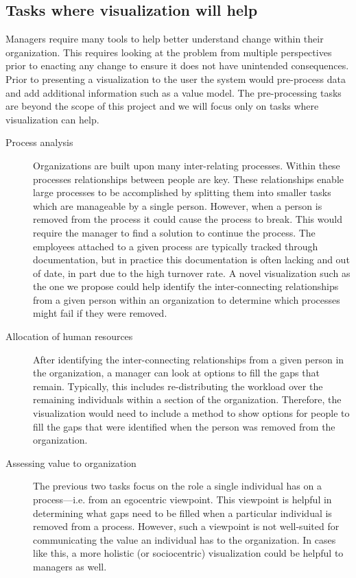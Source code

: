 \documentclass[12pt,letterpaper]{article}
\begin{document}
\subsection{Tasks where visualization will help}

Managers require many tools to help better understand change within their organization.  This requires looking at the problem from multiple perspectives prior to enacting any change to ensure it does not have unintended consequences.  Prior to presenting a visualization to the user the system would pre-process data and add additional information such as a value model.  The pre-processing tasks are beyond the scope of this project and we will focus only on tasks where visualization can help.

\begin{description}
\item [Process analysis] Organizations are built upon many inter-relating processes.  Within these processes relationships between people are key.  These relationships enable large processes to be accomplished by splitting them into smaller tasks which are manageable by a single person.  However, when a person is removed from the process it could cause the process to break.  This would require the manager to find a solution to continue the process.  The employees attached to a given process are typically tracked through documentation, but in practice this documentation is often lacking and out of date, in part due to the high turnover rate.  A novel visualization such as the one we propose could help identify the inter-connecting relationships from a given person within an organization to determine which processes might fail if they were removed.
  
\item [Allocation of human resources] After identifying the inter-connecting relationships from a given person in the organization, a manager can look at options to fill the gaps that remain.  Typically, this includes re-distributing the workload over the remaining individuals within a section of the organization.  Therefore, the visualization would need to include a method to show options for people to fill the gaps that were identified when the person was removed from the organization.
  
\item[Assessing value to organization] The previous two tasks focus on the role a single individual has on a process---i.e. from an egocentric viewpoint. This viewpoint is helpful in determining what gaps need to be filled when a particular individual is removed from a process. However, such a viewpoint is not well-suited for communicating the value an individual has to the organization. In cases like this, a more holistic (or sociocentric) visualization could be helpful to managers as well. 
  

\end{description}
\end{document}
